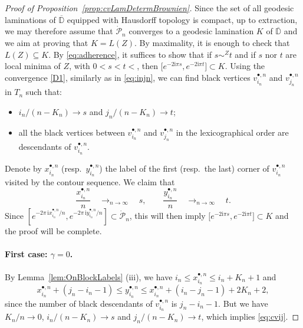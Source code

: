 \documentclass[10pt]{amsart}
\theoremstyle{definition}\newtheorem{defi}[theo]{Definition}\newtheorem{rema}[theo]{Remark}\newtheorem{exam}[theo]{Example}\newtheorem{exem}[theo]{Example}\newtheorem{nota}[theo]{Notation}
\newcommand{\D}{\mathbb{D}}
\def\PPP{\mathcal P}
\begin{document}
\begin{proof}[Proof of Proposition~\ref{prop:cvLamDetermBrownien}]
Since the set of all geodesic laminations of $\overline{\D}$ equipped with Hausdorff topology is compact, up to extraction, we may therefore assume that  $ \dot{\PPP}_{n}$  converges to a geodesic lamination $K$ of $\overline{\D}$ and we aim at proving that $K=L(Z)$.
By maximality, it is enough to check that $ L(Z) \subseteq K$.
By \eqref{eq:adherence},  it suffices to show that if $s \sim^{Z} t$  and if $s$ nor $t$ are local minima of $Z$, with $0<s < t<$, then $\big[e^{-2\textrm{i} \pi s},e^{-2\textrm{i} \pi t}\big] \subset K$.
Using the convergence \ref{D1}, similarly as in \cref{eq:injn}, we can find black vertices
$v^{\bullet,n}_{i_{n}}$ and $v^{\bullet,n}_{j_{n}}$ in $T_{n}$
such that:
\begin{itemize}
\item $i_{n}/(n-K_{n}) \rightarrow s$  and $j_{n}/(n-K_{n}) \rightarrow t$;
\item all the black vertices between $v^{\bullet,n}_{i_{n}}$ and $ v^{\bullet,n}_{j_{n}}$
  in the lexicographical order are descendants of  $v^{\bullet,n}_{i_{n}}$.
\end{itemize}
  Denote by  $x^{\bullet,n}_{i_{n}}$ (resp.~$y ^{\bullet,n}_{i_{n}}$)
  the label of the first (resp.~the last) corner of $v^{\bullet,n}_{i_{n}}$ visited by the contour sequence. We claim that
  \begin{equation}
\label{eq:cvij} \frac{x^{\bullet,n}_{i_{n}}}{n}  \quad \mathop{\longrightarrow}_{n \rightarrow \infty} \quad s, \qquad \frac{y ^{\bullet,n}_{i_{n}}}{n}  \quad \mathop{\longrightarrow}_{n \rightarrow \infty} \quad t.
\end{equation}
Since $[e^{-2\pi\, \textrm{i} {x^{\bullet,n}_{i_{n}}}/{n}}, e^{-2\pi\, \textrm{i} {y ^{\bullet,n}_{i_{n}}}/{n}}] \subset \dot{\PPP}_{n}$, this will then imply $\big[e^{-2\textrm{i} \pi s},e^{-2\textrm{i} \pi t}\big] \subset K$ and the proof will be complete.


\paragraph*{First case: $\gamma=0$.} By  Lemma~\ref{lem:OnBlockLabels}  (iii),
we have $i_{n} \leq x^{\bullet,n}_{i_{n}} \leq i_{n}+ K_{n}+1$ and
\[x^{\bullet,n}_{i_{n}}+ (j_n-i_n-1) \leq y^{\bullet,n}_{i_{n}} \leq x^{\bullet,n}_{i_{n}}+(i_n-j_n-1) +2 K_{n}+2,\]
since the number of black descendants of $v^{\bullet,n}_{i_{n}}$ is $j_{n}-i_{n}-1$.
But we have ${K_{n}}/{n} \rightarrow 0$, $i_{n}/(n-K_{n}) \rightarrow s$  and $j_{n}/(n-K_{n}) \rightarrow t$,
which implies \eqref{eq:cvij}.


\end{proof}
\end{document}
